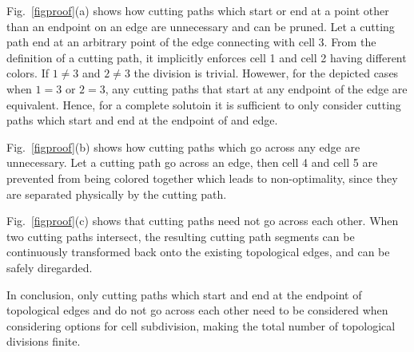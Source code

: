 \documentclass[journal]{IEEEtran}
\begin{document}
Fig.~\ref{figproof}(a) shows how cutting paths which start or end at a point other than an endpoint on an edge are unnecessary and can be pruned. Let a cutting path end at an arbitrary point of the edge connecting with cell 3. From the definition of a cutting path, it implicitly enforces cell 1 and cell 2 having different colors.  
If $1\neq 3$ and $2\neq 3$ the division is trivial. 
Howewer, for the depicted cases when $1=3$ or $2=3$, any cutting paths that start at any endpoint of the edge are equivalent. Hence, for a complete solutoin it is sufficient to only consider cutting paths which start and end at the endpoint of and edge.  

Fig.~\ref{figproof}(b) shows how cutting paths which go across any edge are unnecessary. %
Let a cutting path go across an edge, then cell 4 and cell 5 are prevented from being colored together which leads to non-optimality, since they are separated physically by the cutting path.

Fig.~\ref{figproof}(c) shows that cutting paths need not go across each other. When two cutting paths intersect, 
the resulting cutting path segments can be continuously transformed back onto the existing topological edges, and can be safely diregarded.



In conclusion, only cutting paths which start and end at the endpoint of topological edges and do not go across each other need to be considered when considering options for cell subdivision, making the total number of topological divisions finite. 
\end{document}
